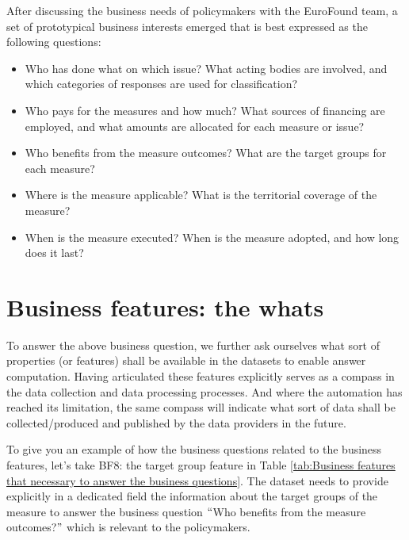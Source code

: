 After discussing the business needs of policymakers with the EuroFound team, a set of prototypical business interests emerged that is best expressed as the following questions:

\begin{itemize}
	\item Who has done what on which issue? What acting bodies are involved, and which categories of responses are used for classification?
	\item Who pays for the measures and how much? What sources of financing are employed, and what amounts are allocated for each measure or issue?
	\item Who benefits from the measure outcomes? What are the target groups for each measure?
	\item Where is the measure applicable? What is the territorial coverage of the measure? 
	\item When is the measure executed? When is the measure adopted, and how long does it last? 
\end{itemize}

\section{Business features: the whats}

To answer the above business question, we further ask ourselves what sort of properties (or features) shall be available in the datasets to enable answer computation. Having articulated these features explicitly serves as a compass in the data collection and data processing processes. And where the automation has reached its limitation, the same compass will indicate what sort of data shall be collected/produced and published by the data providers in the future.

To give you an example of how the business questions related to the business features, let’s take BF8: the target group feature in  Table \ref{tab:Business features that necessary to answer the business questions}. The dataset needs to provide explicitly in a dedicated field the information about the target groups of the measure to answer the business question $``$Who benefits from the measure outcomes?$"$  which is relevant to the policymakers. 




